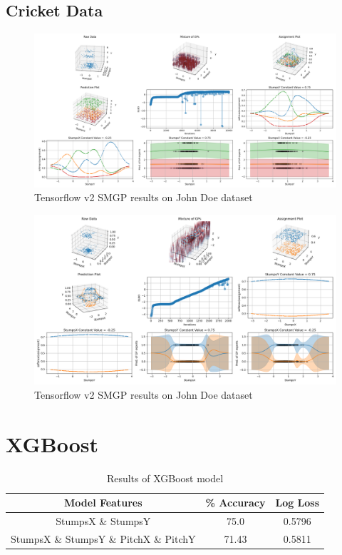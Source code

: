 \documentclass[12pt,a4paper]{report}
\theoremstyle{definition}
\begin{document}
\subsection{Cricket Data}

\begin{figure}[H]
    \centering
    \includegraphics[width=\linewidth]{demo_JohnDoe_RightArmSeam_stumpsX_stumpsY.png}
    \caption{Tensorflow v2 SMGP results on John Doe dataset}
    \label{fig:CricketSMGP}
\end{figure}

\begin{figure}[H]
    \centering
    \includegraphics[width=\linewidth]{demo_JohnDoe_RightArmSeam_stumpsX_stumpsY_multi_class.png}
    \caption{Tensorflow v2 SMGP results on John Doe dataset}
    \label{fig:CricketMulticlassSMGPModified}
\end{figure}

\section{XGBoost}

\begin{table}[H] \label{tab:XGResults}
	\centering
	\caption{Results of XGBoost model}
	\begin{tabular}{| c | c | c |} 
		\hline
		Model Features & \% Accuracy & Log Loss \\ [0.5ex] 
		\hline\hline
		StumpsX \& StumpsY & 75.0 & 0.5796 \\
		\hline
		StumpsX \& StumpsY \& PitchX \& PitchY & 71.43 & 0.5811 \\ [1ex]
		\hline
	\end{tabular}
\end{table}
\end{document}
